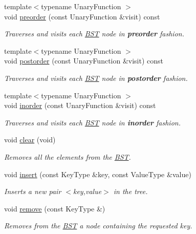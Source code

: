 \begin{DoxyCompactItemize}
{\footnotesize template$<$typename Unary\+Function $>$ }\\void \hyperlink{class_b_s_t_afafd8425898de634afe1d229420cfbb8}{preorder} (const Unary\+Function \&visit) const 
\begin{DoxyCompactList}\small\item\em Traverses and visits each \hyperlink{class_b_s_t}{B\+ST} node in {\bfseries preorder} fashion. \end{DoxyCompactList}\item 
{\footnotesize template$<$typename Unary\+Function $>$ }\\void \hyperlink{class_b_s_t_a938be48246fd9b0b81e64d111f2e1a5d}{postorder} (const Unary\+Function \&visit) const 
\begin{DoxyCompactList}\small\item\em Traverses and visits each \hyperlink{class_b_s_t}{B\+ST} node in {\bfseries postorder} fashion. \end{DoxyCompactList}\item 
{\footnotesize template$<$typename Unary\+Function $>$ }\\void \hyperlink{class_b_s_t_a46608ca07862f7f13cf3520ec6ade82d}{inorder} (const Unary\+Function \&visit) const 
\begin{DoxyCompactList}\small\item\em Traverses and visits each \hyperlink{class_b_s_t}{B\+ST} node in {\bfseries inorder} fashion. \end{DoxyCompactList}\item 
void \hyperlink{class_b_s_t_a6ffadf800779b0f1b1a9742a3bc5cf66}{clear} (void)
\begin{DoxyCompactList}\small\item\em Removes all the elements from the \hyperlink{class_b_s_t}{B\+ST}. \end{DoxyCompactList}\item 
void \hyperlink{class_b_s_t_a809a130ceaa2dbb3a2b077f321675593}{insert} (const Key\+Type \&key, const Value\+Type \&value)
\begin{DoxyCompactList}\small\item\em Inserts a new pair $<${\ttfamily key},{\ttfamily value}$>$ in the tree. \end{DoxyCompactList}\item 
void \hyperlink{class_b_s_t_aa9f0f207322311366b9b014755a798ab}{remove} (const Key\+Type \&)
\begin{DoxyCompactList}\small\item\em Removes from the \hyperlink{class_b_s_t}{B\+ST} a node containing the requested key. \end{DoxyCompactList}\end{DoxyCompactItemize}
